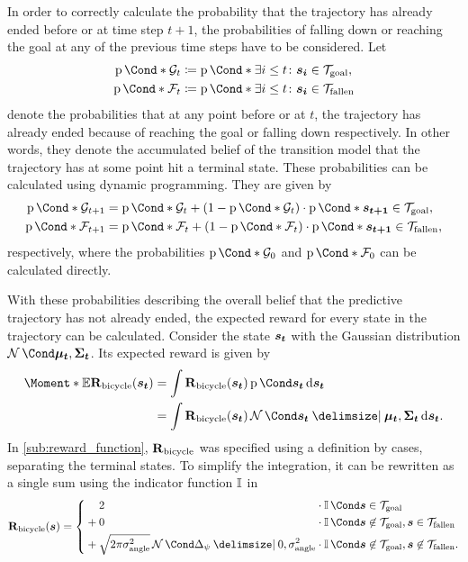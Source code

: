 In order to correctly calculate the probability that the trajectory has already ended before or at time step $t+1$, the probabilities of falling down or reaching the goal at any of the previous time steps have to be considered.
Let
\begin{align}
    \Prob*{\PGoal_t} &\coloneqq \Prob*{\exists i \leq t \colon \mat{s_i} \in \Goal}, \\
    \Prob*{\PFallen_t} &\coloneqq \Prob*{\exists i \leq t \colon \mat{s_i} \in \Fallen}
\end{align}
denote the probabilities that at any point before or at $t$, the trajectory has already ended because of reaching the goal or falling down respectively.
In other words, they denote the accumulated belief of the transition model that the trajectory has at some point hit a terminal state.
These probabilities can be calculated using dynamic programming.
They are given by
\begin{align}
    \Prob*{\PGoal_{t+1}} &= \Prob*{\PGoal_{t}} + \left( 1 - \Prob*{\PGoal_{t}}  \right) \cdot \Prob*{\mat{s_{t+1}} \in \Goal}, \\
    \Prob*{\PFallen_{t+1}} &= \Prob*{\PFallen_{t}} + \left( 1 - \Prob*{\PFallen_{t}}  \right) \cdot \Prob*{\mat{s_{t+1}} \in \Fallen},
\end{align}
respectively, where the probabilities $\Prob*{\PGoal_{0}}$ and $\Prob*{\PFallen_{0}}$ can be calculated directly.

With these probabilities describing the overall belief that the predictive trajectory has not already ended, the expected reward for every state in the trajectory can be calculated.
Consider the state $\bm{s_t}$ with the Gaussian distribution $\Gaussian{\mat{\mu_t}, \mat{\Sigma_t}}$.
Its expected reward is given by
\begin{align}
    \Moment*{\E}{\RwdBicycle(\rv{s_t})} &= \int \RwdBicycle(\rv{s_t}) \Prob{\rv{s_t}} \diff \rv{s_t} \\
    &= \int \RwdBicycle(\rv{s_t}) \Gaussian{\rv{s_t} \given \mat{\mu_t}, \mat{\Sigma_t}} \diff \rv{s_t}.
\end{align}
In \cref{sub:reward_function}, $\operatorname{\operatorname{\mathbf{R}}_{\text{bicycle}}}$ was specified using a definition by cases, separating the terminal states.
To simplify the integration, it can be rewritten as a single sum using the indicator function $\operatorname{\mathbb{I}}$ in
\begin{align}
    \RwdBicycle(\mat{s}) = \left\{ \begin{alignedat}{3}
            &&& 2 &&\cdot \Indicator{\rv{s} \in \Goal} \\
            &&{}+{}& 0 &&\cdot \Indicator{\rv{s} \not\in\Goal, \rv{s} \in \Fallen} \\
            &&{}+{}& \sqrt{2\pi\sigma_{\text{angle}}^2}\Gaussian{\Delta_\psi \given 0, \sigma_{\text{angle}}^2} &&\cdot \Indicator{\rv{s} \not\in\Goal, \rv{s} \not\in\Fallen}.
        \end{alignedat}\right.
\end{align}

